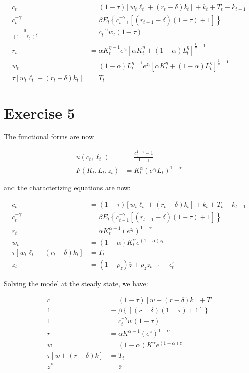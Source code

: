 \documentclass[11pt]{article}
\numberwithin{equation}{section}
\theoremstyle{plain}
\theoremstyle{definition}
\newcommand\parens[1]{\left( #1 \right)}
\newcommand{\1}{\mathbbm 1}
\def\a{\alpha}
\def\g{\gamma}
\begin{document}
\begin{align}
c_{t}&=(1-\tau)\left[w_{t} \ell_{t}+\left(r_{t}-\delta\right) k_{t}\right]+k_{t}+T_{t}-k_{t+1} \\
c_t^{-\g}&=\beta E_{t}\left\{c_{t+1}^{-\g}\left[\left(r_{t+1}-\delta\right)(1-\tau)+1\right]\right\} \\
\frac{a}{(1-\ell_t)^{\xi}}&=c_t^{-\g} w_{t}(1-\tau) \\
r_{t}&=\a K_{t}^{\eta - 1} e^{z_{t}} \left[\alpha K_{t}^{\eta}+(1-\alpha) L_{t}^{\eta}\right]^{\frac{1}{\eta} - 1} \\
w_{t}&=(1-\a) L_{t}^{\eta - 1} e^{z_{t}} \left[\alpha K_{t}^{\eta}+(1-\alpha) L_{t}^{\eta}\right]^{\frac{1}{\eta} - 1} \\
\tau\left[w_{t} \ell_{t}+\left(r_{t}-\delta\right) k_{t}\right]&=T_{t}
\end{align}


\section{Exercise 5}
The functional forms are now 

\begin{align} 
 u\left(c_{t}, \ell_{t}\right) &=\frac{c_{t}^{1-\gamma}-1}{1-\gamma} \\ 
 F\left(K_{t}, L_{t}, z_{t}\right) &= K_{t}^{\alpha} \parens{e^{z_{t}} L_{t}}^{1-\alpha} 
 \end{align}

and the characterizing equations are now:

\begin{align}
c_{t}&=(1-\tau)\left[w_{t} \ell_{t}+\left(r_{t}-\delta\right) k_{t}\right]+k_{t}+T_{t}-k_{t+1} \\
c_t^{-\g}&=\beta E_{t}\left\{c_{t+1}^{-\g}\left[\left(r_{t+1}-\delta\right)(1-\tau)+1\right]\right\} \\
r_{t}&=\a K_{t}^{\alpha - 1} \parens{e^{z_{t}}}^{1-\alpha} \\
w_{t}&=(1-\a)K_{t}^{\alpha} e^{(1- \alpha) z_{t}} \\
\tau\left[w_{t} \ell_{t}+\left(r_{t}-\delta\right) k_{t}\right]&=T_t \\
z_{t}&=\left(1-\rho_{z}\right) \overline{z}+\rho_{z} z_{t-1}+
\epsilon_{t}^{z}
\end{align}


Solving the model at the steady state, we have:

\begin{align}
c&=(1-\tau)\left[w+\left(r-\delta\right) k\right]+T \\
1&=\beta \left\{\left[\left(r-\delta\right)(1-\tau)+1\right]\right\} \\
1&=c_t^{-\g} w(1-\tau) \\
r&=\a K^{\alpha - 1} \parens{e^{z}}^{1-\alpha} \\
w&=(1-\a)K^{\alpha} e^{(1- \alpha) z} \\
\tau\left[w+\left(r-\delta\right) k\right]&=T_t \\
z^{*}&=\overline{z}
\end{align}
\end{document}
